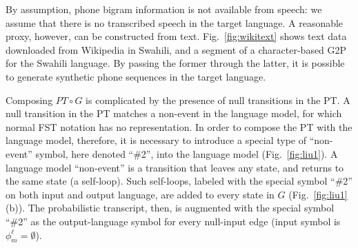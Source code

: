 By assumption, phone bigram information is not available from speech:
we assume that there is no transcribed speech in the target language.
A reasonable proxy, however, can be constructed from text.
Fig.~\ref{fig:wikitext} shows text data downloaded from Wikipedia in
Swahili, and a segment of a character-based G2P for
the Swahili language.  By passing the former
through the latter, it is possible to generate synthetic phone
sequences in the target language.

Composing $PT\circ G$ is complicated by the presence of null
transitions in the PT.  A null transition in the PT matches a
non-event in the language model, for which normal FST notation has no
representation. In order to compose the PT with the language model,
therefore, it is necessary to introduce a special type of
``non-event'' symbol, here denoted ``\#2'', into the language model
(Fig.~\ref{fig:liu1}).  A language
model ``non-event'' is a transition that leaves any state, and returns
to the same state (a self-loop).  Such self-loops, labeled with the
special symbol ``\#2'' on both input and output language, are added to
every state in $G$ (Fig.~\ref{fig:liu1} (b)).
The probabilistic transcript, then, is
augmented with the special symbol ``\#2'' as the output-language symbol
for every null-input edge (input symbol is $\phi_m^\ell =\emptyset$).
